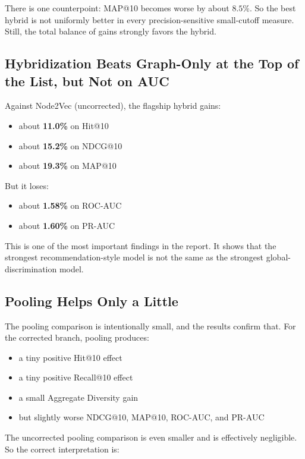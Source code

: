 \documentclass[11pt,a4paper]{article}
\begin{document}
There is one counterpoint: MAP@10 becomes worse by about $8.5\%$. So the best
hybrid is not uniformly better in every precision-sensitive small-cutoff
measure. Still, the total balance of gains strongly favors the hybrid.

\subsection{Hybridization Beats Graph-Only at the Top of the List, but Not on AUC}
Against Node2Vec (uncorrected), the flagship hybrid gains:

\begin{itemize}
    \item about \textbf{11.0\%} on Hit@10
    \item about \textbf{15.2\%} on NDCG@10
    \item about \textbf{19.3\%} on MAP@10
\end{itemize}

But it loses:

\begin{itemize}
    \item about \textbf{1.58\%} on ROC-AUC
    \item about \textbf{1.60\%} on PR-AUC
\end{itemize}

This is one of the most important findings in the report. It shows that the
strongest recommendation-style model is not the same as the strongest
global-discrimination model.

\subsection{Pooling Helps Only a Little}
The pooling comparison is intentionally small, and the results confirm that.
For the corrected branch, pooling produces:

\begin{itemize}
    \item a tiny positive Hit@10 effect
    \item a tiny positive Recall@10 effect
    \item a small Aggregate Diversity gain
    \item but slightly worse NDCG@10, MAP@10, ROC-AUC, and PR-AUC
\end{itemize}

The uncorrected pooling comparison is even smaller and is effectively
negligible. So the correct interpretation is:
\end{document}
